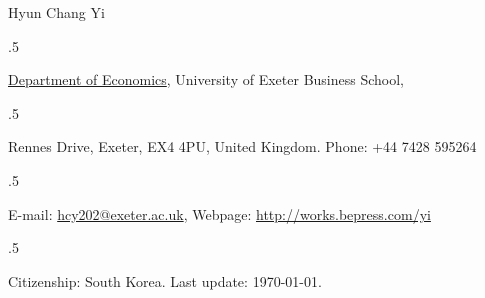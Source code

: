 \documentclass[letterpaper,11pt]{article}
\def\name{Hyun Chang Yi}
\renewenvironment{itemize}{
\begin{list}{}{
\setlength{\leftmargin}{1.5em}
}
}{
\end{list}
}
\begin{document}

\centerline{ \Huge \name}

\noindent\makebox[\linewidth]{\rule{\textwidth}{2pt}} 



\moveleft.5\hoffset\centerline{\href{http://business-school.exeter.ac.uk/research/areas/topics/economics/}{Department of Economics}, University of Exeter Business School,}
\moveleft.5\hoffset\centerline{Rennes Drive, Exeter, EX4 4PU, United Kingdom. Phone: +44 7428 595264}
\moveleft.5\hoffset\centerline{E-mail: \href{mailto:hcy202@exeter.ac.uk}{\color{blue}hcy202@exeter.ac.uk}, Webpage: \href{http://works.bepress.com/yi}{\color{blue}http://works.bepress.com/yi}}
\moveleft.5\hoffset\centerline{Citizenship: South Korea. Last update: \today.}


%
%
\end{document}
